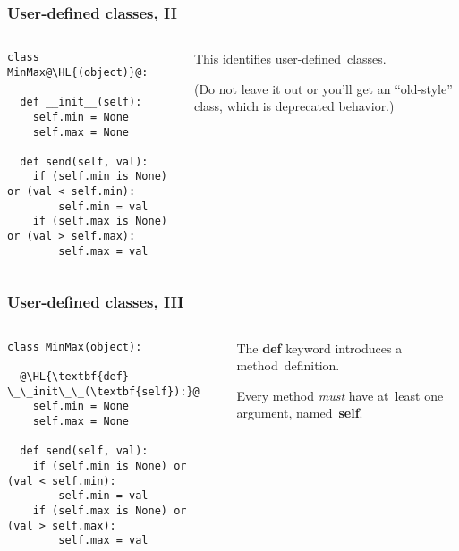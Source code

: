 \documentclass[english,serif,mathserif,xcolor=pdftex,dvipsnames,table]{beamer}
\begin{document}
\begin{frame}[fragile]
  \frametitle{User-defined classes, II}
  \begin{columns}[t]
    \begin{column}{0.5\textwidth}
\begin{lstlisting}
class MinMax@\HL{(object)}@:

  def __init__(self):
    self.min = None
    self.max = None

  def send(self, val):
    if (self.min is None) or (val < self.min):
        self.min = val
    if (self.max is None) or (val > self.max):
        self.max = val
\end{lstlisting}
    \end{column}
    \begin{column}{0.5\textwidth}
      \raggedleft 
      This identifies user-defined~classes.

      (Do not leave it out or you'll get an ``old-style'' class, which
      is deprecated behavior.)
    \end{column}
  \end{columns}
\end{frame}


\begin{frame}[fragile]
  \frametitle{User-defined classes, III}
  \begin{columns}[t]
    \begin{column}{0.5\textwidth}
\begin{lstlisting}
class MinMax(object):

  @\HL{\textbf{def} \_\_init\_\_(\textbf{self}):}@
    self.min = None
    self.max = None

  def send(self, val):
    if (self.min is None) or (val < self.min):
        self.min = val
    if (self.max is None) or (val > self.max):
        self.max = val
\end{lstlisting}
    \end{column}
    \begin{column}{0.5\textwidth}
      \raggedleft 
      The {\bf def} keyword introduces a method~definition.

      \+
      Every method \emph{must} have at~least one argument,
      named~{\bf self}.
    \end{column}
  \end{columns}
\end{frame}
\end{document}
